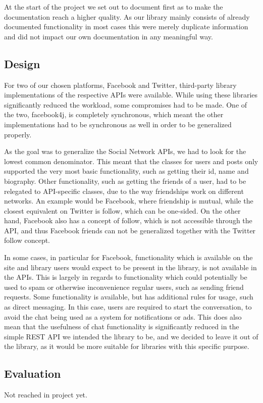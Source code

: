 \documentclass{sigchi-alternate}
\begin{document}
At the start of the project we set out to document first as to make the documentation reach a higher quality. As our library mainly consists of already documented functionality in most cases this were merely duplicate
information and did not impact our own documentation in any meaningful way.

\subsection{Design}
For two of our chosen platforms, Facebook and Twitter, third-party library implementations of the respective APIs were available. While using these libraries significantly reduced the workload, some compromises had to
be made. One of the two, facebook4j, is completely synchronous, which meant the other implementations had to be synchronous as well in order to be generalized properly.

As the goal was to generalize the Social Network APIs, we had to look for the lowest common denominator. This meant that the classes for users and posts only supported the very most basic functionality, such as getting
their id, name and biography. Other functionality, such as getting the friends of a user, had to be relegated to API-specific classes, due to the way friendships work on different networks. An example would be Facebook,
where friendship is mutual, while the closest equivalent on Twitter is follow, which can be one-sided. On the other hand, Facebook also has a concept of follow, which is not accessible through the API, and thus Facebook
friends can not be generalized together with the Twitter follow concept.

In some cases, in particular for Facebook, functionality which is available on the site and library users would expect to be present in the library, is not available in the APIs. This is largely in regards to functionality
which could potentially be used to spam or otherwise inconvenience regular users, such as sending friend requests. Some functionality is available, but has additional rules for usage, such as direct messaging. In this case,
users are required to start the conversation, to avoid the chat being used as a system for notifications or ads. This does also mean that the usefulness of chat functionality is significantly reduced in the simple REST API
we intended the library to be, and we decided to leave it out of the library, as it would be more suitable for libraries with this specific purpose.

\subsection{Evaluation}
Not reached in project yet.
\end{document}
